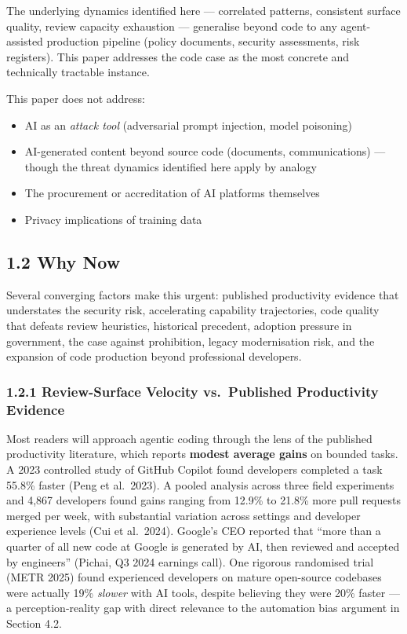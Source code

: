 \documentclass[a4paper,11pt]{report}
\providecommand{\tightlist}{%
  \setlength{\itemsep}{0pt}\setlength{\parskip}{0pt}}
\begin{document}
The underlying dynamics identified here --- correlated patterns,
consistent surface quality, review capacity exhaustion --- generalise
beyond code to any agent-assisted production pipeline (policy documents,
security assessments, risk registers). This paper addresses the code
case as the most concrete and technically tractable instance.

This paper does not address:

\begin{itemize}
\tightlist
\item
  AI as an \emph{attack tool} (adversarial prompt injection, model
  poisoning)
\item
  AI-generated content beyond source code (documents, communications)
  --- though the threat dynamics identified here apply by analogy
\item
  The procurement or accreditation of AI platforms themselves
\item
  Privacy implications of training data
\end{itemize}

\hypertarget{why-now}{%
\subsection{1.2 Why Now}\label{why-now}}

Several converging factors make this urgent: published productivity
evidence that understates the security risk, accelerating capability
trajectories, code quality that defeats review heuristics, historical
precedent, adoption pressure in government, the case against
prohibition, legacy modernisation risk, and the expansion of code
production beyond professional developers.

\hypertarget{review-surface-velocity-vs.-published-productivity-evidence}{%
\subsubsection{1.2.1 Review-Surface Velocity vs.~Published Productivity
Evidence}\label{review-surface-velocity-vs.-published-productivity-evidence}}

Most readers will approach agentic coding through the lens of the
published productivity literature, which reports \textbf{modest average
gains} on bounded tasks. A 2023 controlled study of GitHub Copilot found
developers completed a task 55.8\% faster (Peng et al.~2023). A pooled
analysis across three field experiments and 4,867 developers found gains
ranging from 12.9\% to 21.8\% more pull requests merged per week, with
substantial variation across settings and developer experience levels
(Cui et al.~2024). Google's CEO reported that ``more than a quarter of
all new code at Google is generated by AI, then reviewed and accepted by
engineers'' (Pichai, Q3 2024 earnings call). One rigorous randomised
trial (METR 2025) found experienced developers on mature open-source
codebases were actually 19\% \emph{slower} with AI tools, despite
believing they were 20\% faster --- a perception-reality gap with direct
relevance to the automation bias argument in Section 4.2.
\end{document}
